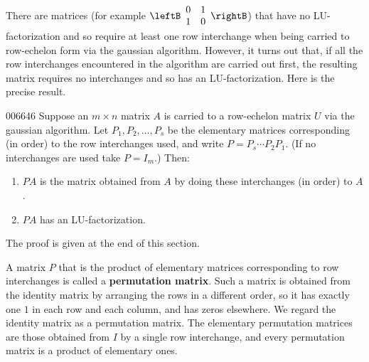 There are matrices (for example $\leftB \begin{array}{rr}
0 & 1 \\
1 & 0
\end{array} \rightB$) that have no LU-factorization and so require at least one row interchange when being carried to row-echelon form via the gaussian algorithm. However, it turns out that, if all the row interchanges encountered in the algorithm are carried out first, the resulting matrix requires no interchanges and so has an LU-factorization. Here is the precise result.

\begin{theorem}{}{006646}
Suppose an $m \times n$ matrix $A$ is carried to a row-echelon matrix $U$ via the gaussian algorithm. Let $P_{1}, P_{2}, \dots, P_{s}$ be the elementary matrices corresponding (in order) to the row interchanges used, and write $P = P_{s} \cdots P_{2}P_{1}$. (If no interchanges are used take $P = I_{m}$.) Then:

\begin{enumerate}
\item $PA$ is the matrix obtained from $A$ by doing these interchanges (in order) to $A$.

\item $PA$ has an LU-factorization.

\end{enumerate}
\end{theorem}

\noindent The proof is given at the end of this section.

A matrix $P$ that is the product of elementary matrices corresponding to row interchanges is called a \textbf{permutation matrix}. Such a matrix is obtained from the identity matrix by arranging the rows in a different order, so it has exactly one $1$ in each row and each column, and has zeros elsewhere. We regard the identity matrix as a permutation matrix. The elementary permutation matrices are those obtained from $I$ by a single row interchange, and every permutation matrix is a product of elementary ones.


